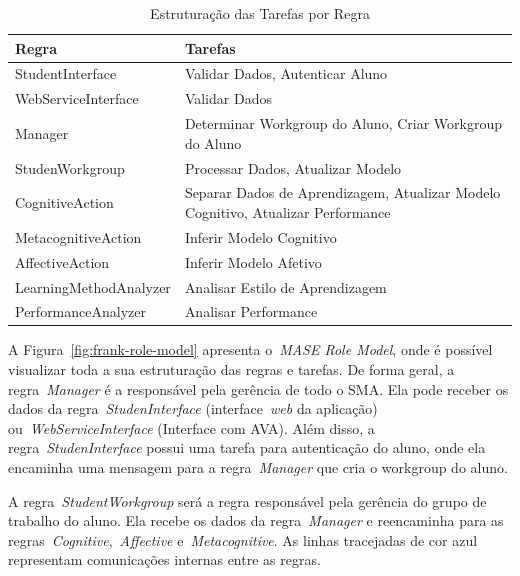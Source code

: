 \begin{table}
	\caption{Estruturação das Tarefas por Regra}
	\begin{tabular}{|p{5cm} | p{9cm}|}
		\hline
		\textbf{Regra}		& \textbf{Tarefas} \\
		\hline
		StudentInterface 	& Validar Dados, Autenticar Aluno  \\
		\hline
		WebServiceInterface 	& Validar Dados  \\
		\hline
		Manager 		& Determinar Workgroup do Aluno, Criar Workgroup do Aluno  \\ %
		\hline
		StudenWorkgroup 	& Processar Dados, Atualizar Modelo   \\
		\hline
		CognitiveAction 	& Separar Dados de Aprendizagem, Atualizar Modelo Cognitivo, Atualizar Performance  \\
		\hline
		MetacognitiveAction 	& Inferir Modelo Cognitivo  \\
		\hline
		AffectiveAction 	& Inferir Modelo Afetivo  \\
		\hline
		LearningMethodAnalyzer 	& Analisar Estilo de Aprendizagem  \\
		\hline
		PerformanceAnalyzer 	& Analisar Performance  \\
		\hline
	\end{tabular}
	\label{tabela:mase-role-model}
\end{table}

A Figura~\ref{fig:frank-role-model} apresenta o~\emph{MASE Role Model}, onde é possível visualizar toda a sua estruturação das regras e tarefas. De forma geral, a regra~\emph{Manager} é a responsável pela gerência de todo o SMA. Ela pode receber os dados da regra~\emph{StudenInterface} (interface~\emph{web} da aplicação) ou~\emph{WebServiceInterface} (Interface com AVA). Além disso, a regra~\emph{StudenInterface} possui uma tarefa para autenticação do aluno, onde ela encaminha uma mensagem para a regra~\emph{Manager} que cria o workgroup do aluno.

A regra~\emph{StudentWorkgroup} será a regra responsável pela gerência do grupo de trabalho do aluno. Ela recebe os dados da regra~\emph{Manager} e reencaminha para as regras~\emph{Cognitive},~\emph{Affective} e~\emph{Metacognitive}. As linhas tracejadas de cor azul representam comunicações internas entre as regras.

